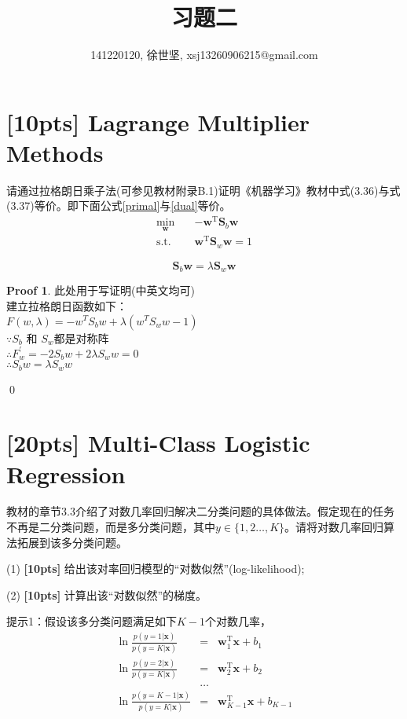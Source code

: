 \documentclass[a4paper,UTF8]{article}
\numberwithin{equation}{section}
\theoremstyle{definition}
\newtheorem*{prove}{Proof}
\begin{document}
\title{习题二}
\author{141220120, 徐世坚, xsj13260906215@gmail.com}
\maketitle
\section{[10pts] Lagrange Multiplier Methods}
请通过拉格朗日乘子法(可参见教材附录B.1)证明《机器学习》教材中式(3.36)与式(3.37)等价。即下面公式\eqref{primal}与\eqref{dual}等价。
\begin{equation}
\label{primal}
\begin{split}
 \min_{\mathbf{w}} \quad &-\mathbf{w}^\mathrm{T} \mathbf{S}_b\mathbf{w}\\ 
\text{s.t.} \quad &\mathbf{w}^\mathrm{T} \mathbf{S}_w\mathbf{w} = 1
\end{split}
\end{equation}

\begin{equation}
\label{dual}
\mathbf{S}_b\mathbf{w} = \lambda \mathbf{S}_w\mathbf{w}
\end{equation}
\begin{prove}
此处用于写证明(中英文均可)\\
建立拉格朗日函数如下：\\
$F(w,\lambda)=-w^T S_b w+\lambda (w^T S_w w-1)$\\
$\because S_b$ 和 $ S_w $都是对称阵\\
$\therefore F^{'}_w = -2 S_b w + 2 \lambda S_w w = 0 $\\
$\therefore S_b w = \lambda S_w w$

\qed
\end{prove}

\section{[20pts] Multi-Class Logistic Regression}
教材的章节3.3介绍了对数几率回归解决二分类问题的具体做法。假定现在的任务不再是二分类问题，而是多分类问题，其中$y\in\{1,2\dots,K\}$。请将对数几率回归算法拓展到该多分类问题。

(1) \textbf{[10pts]} 给出该对率回归模型的“对数似然”(log-likelihood);

(2) \textbf{[10pts]} 计算出该“对数似然”的梯度。

提示1：假设该多分类问题满足如下$K-1$个对数几率，
\begin{eqnarray*}
\ln\frac{p(y=1|\mathbf{x})}{p(y=K|\mathbf{x})}&=&\mathbf{w}_1^\mathrm{T}\mathbf{x}+b_1\\
\ln\frac{p(y=2|\mathbf{x})}{p(y=K|\mathbf{x})}&=&\mathbf{w}_2^\mathrm{T}\mathbf{x}+b_2\\
&\dots&\\
\ln\frac{p(y={K-1}|\mathbf{x})}{p(y=K|\mathbf{x})}&=&\mathbf{w}_{K-1}^\mathrm{T}\mathbf{x}+b_{K-1}
\end{eqnarray*}
\end{document}

